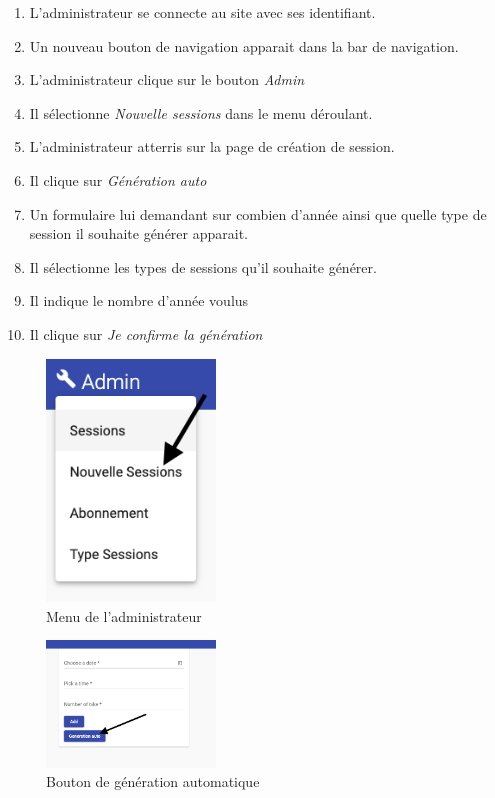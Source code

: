 \begin{enumerate}
	\item L'administrateur se connecte au site avec ses identifiant. 
	\item Un nouveau bouton de navigation apparait dans la bar de navigation. 
	\item L'administrateur clique sur le bouton \textit{Admin}
	\item Il sélectionne \textit{Nouvelle sessions} dans le menu déroulant. 
	\item L'administrateur atterris sur la page de création de session. 
	\item Il clique sur \textit{Génération auto}
	\item Un formulaire lui demandant sur combien d'année ainsi que quelle type de session il souhaite générer apparait.
	\item Il sélectionne les types de sessions qu'il souhaite générer.
	\item Il indique le nombre d'année voulus
	\item Il clique sur \textit{Je confirme la génération} 
\end{enumerate}

\vspace{\baselineskip}
\begin{figure}[h]
	\includegraphics[width=0.4\textwidth,center]{Figures/us16-1}
	\caption{Menu de l'administrateur}
\end{figure}

\newpage
\begin{figure}[h]
	\includegraphics[width=0.4\textwidth,center]{Figures/us16-2}
	\caption{Bouton de génération automatique}
\end{figure}

